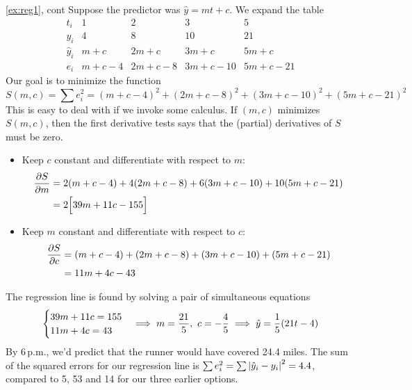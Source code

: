 \begin{example*}{\ref{ex:reg1}, cont}{}
Suppose the predictor was $\hat y=mt+c$. We expand the table
\[\begin{array}{c|ccccc}
t_i&1&2&3&5\\\hline
y_i&4&8&10&21\\\hline
\hat y_i&m+c&2m+c&3m+c&5m+c\\\hline
e_i&m+c-4&2m+c-8&3m+c-10&5m+c-21
\end{array}\]
Our goal is to minimize the function
\[S(m,c) =\sum e_i^2= (m+c-4)^2 +(2m+c-8)^2 +(3m+c-10)^2 +(5m+c-21)^2\]
This is easy to deal with if we invoke some calculus. If $(m,c)$ minimizes $S(m,c)$, then the first derivative tests says that the (partial) derivatives of $S$ must be zero.%
\begin{itemize}\itemsep0pt
  \item Keep $c$ constant and differentiate with respect to $m$:
  \begin{align*}
	\partials[S]{m} &=2(m+c-4) +4(2m+c-8) +6(3m+c-10) +10(5m+c-21)\\
	&=2\Bigl[39m+11c-155\Bigr]
	\end{align*}
	\item Keep $m$ constant and differentiate with respect to $c$:
  \begin{align*}
	\partials[S]{c} &=(m+c-4) +(2m+c-8) +(3m+c-10) +(5m+c-21)\\
	&=11m+4c-43
	\end{align*}
\end{itemize}
The regression line is found by solving a pair of simultaneous equations
\[\begin{cases}
39m+11c=155\\
11m+4c=43
\end{cases} \negthickspace\implies m=\frac{21}{5},\ c=-\frac{4}{5} \implies \hat y=\frac 1{5}(21t-4)\]
By 6\,p.m., we'd predict that the runner would have covered 24.4 miles. The sum of the squared errors for our regression line is $\sum e_i^2=\sum\nm{\hat y_i-y_i}^2=4.4$, compared to 5, 53 and 14 for our three earlier options.
\end{example*}


